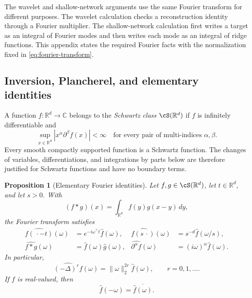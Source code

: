 \documentclass[11pt,twoside]{article}
\newcommand{\R}{\mathbb R}
\newtheorem{proposition}[theorem]{Proposition}
\theoremstyle{definition}
\theoremstyle{remark}
\begin{document}
The wavelet and shallow-network arguments use the same Fourier transform for
different purposes. The wavelet calculation checks a reconstruction identity
through a Fourier multiplier. The shallow-network calculation first writes a
target as an integral of Fourier modes and then writes each mode as an
integral of ridge functions. This appendix states the required Fourier facts
with the normalization fixed in \cref{eq:fourier-transform}.

\subsection{Inversion, Plancherel, and elementary identities}

A function $f:\R^d\to\mathbb C$ belongs to the \emph{Schwartz class}
$\cS(\R^d)$ if $f$ is infinitely differentiable and
\begin{equation}
 \sup_{x\in\R^d}|x^\alpha\partial^\beta f(x)|<\infty
 \quad\text{for every pair of multi-indices $\alpha,\beta$.}
 \label{eq:schwartz-class}
\end{equation}
Every smooth compactly supported function is a Schwartz function. The
changes of variables, differentiations, and integrations by parts below are
therefore justified for Schwartz functions and have no boundary terms.

\begin{proposition}[Elementary Fourier identities]
\label{prop:elementary-fourier-identities}
Let $f,g\in\cS(\R^d)$, let $t\in\R^d$, and let $s>0$. With
\begin{equation}
 (f*g)(x)=\int_{\R^d}f(y)g(x-y)\,dy,
 \label{eq:convolution-definition}
\end{equation}
the Fourier transform satisfies
\begin{align}
 \widehat{f(\,\cdot-t)}(\omega)
 &=e^{-i\omega^\top t}\widehat f(\omega),
 &
 \widehat{f(s\,\cdot)}(\omega)
 &=s^{-d}\widehat f(\omega/s),
 \label{eq:fourier-translation-dilation}\\
 \widehat{f*g}(\omega)
 &=\widehat f(\omega)\widehat g(\omega),
 &
 \widehat{\partial^\alpha f}(\omega)
 &=(i\omega)^\alpha\widehat f(\omega).
 \label{eq:fourier-convolution-differentiation}
\end{align}
In particular,
\begin{equation}
 \widehat{(-\Delta)^r f}(\omega)
 =\|\omega\|_2^{2r}\widehat f(\omega),
 \qquad r=0,1,\ldots.
 \label{eq:fourier-laplacian}
\end{equation}
If $f$ is real-valued, then
\begin{equation}
 \widehat f(-\omega)=\overline{\widehat f(\omega)}.
 \label{eq:fourier-conjugate-symmetry}
\end{equation}
\end{proposition}
\end{document}
